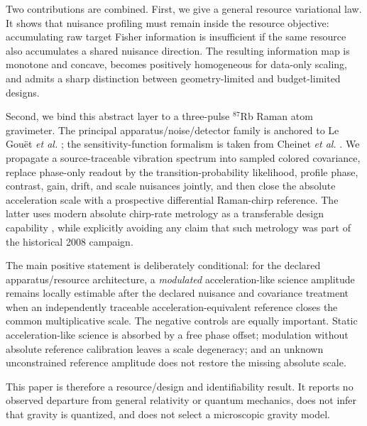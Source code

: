 Two contributions are combined. First, we give a general resource variational law. It shows that nuisance profiling must remain inside the resource objective: accumulating raw target Fisher information is insufficient if the same resource also accumulates a shared nuisance direction. The resulting information map is monotone and concave, becomes positively homogeneous for data-only scaling, and admits a sharp distinction between geometry-limited and budget-limited designs.

Second, we bind this abstract layer to a three-pulse $^{87}$Rb Raman atom gravimeter. The principal apparatus/noise/detector family is anchored to Le Gou\"et \emph{et al.} \cite{LeGouet2008}; the sensitivity-function formalism is taken from Cheinet \emph{et al.} \cite{Cheinet2008}. We propagate a source-traceable vibration spectrum into sampled colored covariance, replace phase-only readout by the transition-probability likelihood, profile phase, contrast, gain, drift, and scale nuisances jointly, and then close the absolute acceleration scale with a prospective differential Raman-chirp reference. The latter uses modern absolute chirp-rate metrology as a transferable design capability \cite{Zhang2025}, while explicitly avoiding any claim that such metrology was part of the historical 2008 campaign.

The main positive statement is deliberately conditional: for the declared apparatus/resource architecture, a \emph{modulated} acceleration-like science amplitude remains locally estimable after the declared nuisance and covariance treatment when an independently traceable acceleration-equivalent reference closes the common multiplicative scale. The negative controls are equally important. Static acceleration-like science is absorbed by a free phase offset; modulation without absolute reference calibration leaves a scale degeneracy; and an unknown unconstrained reference amplitude does not restore the missing absolute scale.

This paper is therefore a resource/design and identifiability result. It reports no observed departure from general relativity or quantum mechanics, does not infer that gravity is quantized, and does not select a microscopic gravity model.

